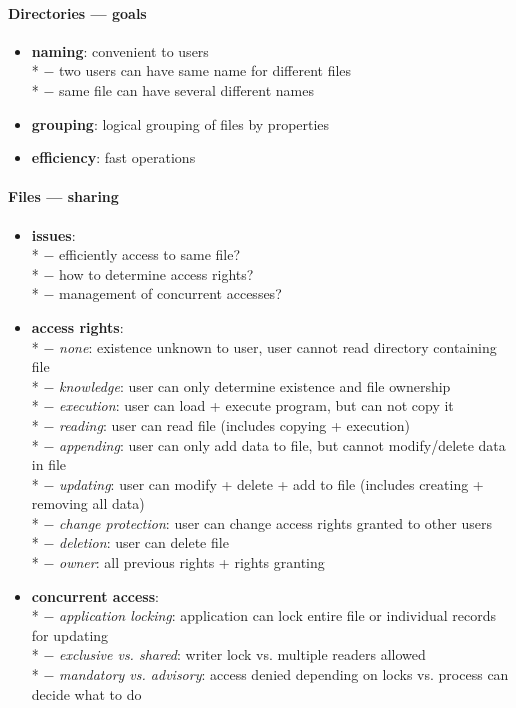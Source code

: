 \paragraph{Directories --- goals}
\begin{itemize}
  \item \textbf{naming}: convenient to users \\*
    $ - $ two users can have same name for different files \\*
    $ - $ same file can have several different names
  \item \textbf{grouping}: logical grouping of files by properties
  \item \textbf{efficiency}: fast operations
\end{itemize}

\paragraph{Files --- sharing}
\begin{itemize}
  \item \textbf{issues}: \\*
    $ - $ efficiently access to same file? \\*
    $ - $ how to determine access rights? \\*
    $ - $ management of concurrent accesses?
  \item \textbf{access rights}: \\*
    $ - $ \emph{none}: existence unknown to user, user cannot read directory containing file \\*
    $ - $ \emph{knowledge}: user can only determine existence and file ownership \\*
    $ - $ \emph{execution}: user can load + execute program, but can not copy it \\*
    $ - $ \emph{reading}: user can read file (includes copying + execution) \\*
    $ - $ \emph{appending}: user can only add data to file, but cannot modify/delete data in file \\*
    $ - $ \emph{updating}: user can modify + delete + add to file (includes creating + removing all data) \\*
    $ - $ \emph{change protection}: user can change access rights granted to other users \\*
    $ - $ \emph{deletion}: user can delete file \\*
    $ - $ \emph{owner}: all previous rights + rights granting
  \item \textbf{concurrent access}: \\*
    $ - $ \emph{application locking}: application can lock entire file or individual records for updating \\*
    $ - $ \emph{exclusive vs. shared}: writer lock vs. multiple readers allowed \\*
    $ - $ \emph{mandatory vs. advisory}: access denied depending on locks vs. process can decide what to do
\end{itemize}